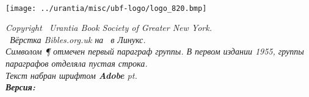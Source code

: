 \begin{center}
\bibcovertitlefont\urantiabook\\
\upshape
{}
\texttt{[image: ../urantia/misc/ubf-logo/logo\_820.bmp]} \\
\end{center}

\titleframe

\newpage

\begin{center}
\itshape
{}
Copyright \textcopyright\ Urantia Book Society of Greater New York.\\
\tux\ Вёрстка Bibles.org.uk на \XeLaTeX\ в Линукс.\\
Символом {\upshape \P} отмечен первый параграф группы. В первом издании 1955, группы параграфов отделяла пустая строка.\\
Текст набран шрифтом \textbf{Adobe \urantiamainfont} \urantiamainfontsize pt.\\[4pt]
\upshape\normalsize\bfseries Версия: \mytoday{}\\
\end{center}

\titleframe
